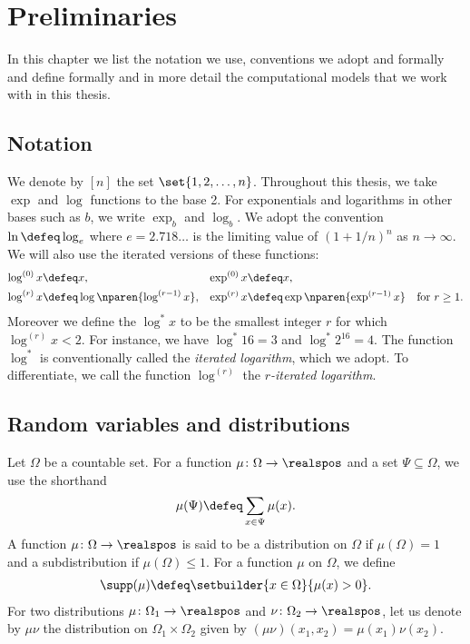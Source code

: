 \chapter{Preliminaries}
\label{sec:prelim}

In this chapter we list the notation we use, conventions we adopt
and formally and define formally and in more detail 
the computational models that we work with in this thesis. 

\section{Notation}
\label{sec:prelim:notation}

We denote by $[n]$ the set $\set{1,2,\ldots,n}$. 
Throughout this thesis, we
take $\exp$ and $\log$ functions to the base 2.
For exponentials and logarithms in other bases
such as $b$, we write $\exp_b$ and $\log_b$. 
We adopt the convention $\ln \defeq \log_e$ where $e=2.718\ldots$
is the limiting value of $(1+1/n)^n$ as $n\to \infty$.
We will also use
the iterated versions of these functions:
\begin{align*}
  \log^{(0)}x&\defeq x, 
             & 
  \exp^{(0)}x&\defeq x,\\
  \log^{(r)}x&\defeq \log\nparen{\log^{(r-1)}x}, 
             & 
  \exp^{(r)}x&\defeq \exp\nparen{\exp^{(r-1)}x}
  \quad\text{for $r\geq 1$}.
\end{align*}
Moreover we define the $\log^* x$ to be the smallest integer $r$ 
for which $\log^{(r)} x<2$. For instance, we have $\log^* 16 = 3$ and
$\log^* 2^{16} = 4$.
The function $\log^*$ is conventionally called the 
{\em iterated logarithm}, which we adopt. 
To differentiate, we call the function $\log^{(r)}$ the 
{\em $r$-iterated logarithm}.

\section{Random variables and distributions}
\label{sec:prelim:rand}
Let $\Omega$ be a countable set. 
For a function $\mu\colon\Omega\to\realspos$ and a set 
$\Psi\subseteq\Omega$, we use the shorthand
\begin{align*}
\mu(\Psi) \defeq \sum_{x\in\Psi}\mu(x).
\end{align*}
A function $\mu\colon\Omega\to\realspos$
is said to be a distribution on $\Omega$ if
$\mu(\Omega) = 1$ and a subdistribution
if $\mu(\Omega) \le 1$. For a function
$\mu$ on $\Omega$, we define
\begin{align*}
\supp(\mu)\defeq \setbuilder{x\in \Omega}{\mu(x)>0}.
\end{align*}
For two distributions $\mu\colon\Omega_1\to\realspos$
and $\nu\colon\Omega_2\to\realspos$, let us denote by
$\mu\nu$ the distribution on $\Omega_1\times\Omega_2$
given by $(\mu\nu)(x_1,x_2) = \mu(x_1)\nu(x_2)$.

